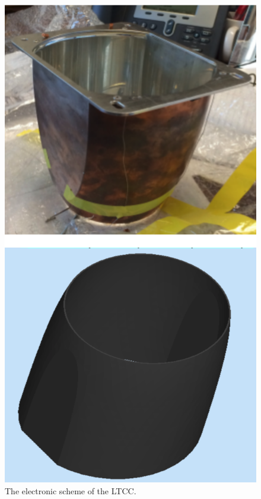 \begin{figure}
	\centering
	\includegraphics[width=0.95\columnwidth,keepaspectratio]{img/sim2.png}
	\caption{The electronic scheme of the LTCC.}
	\label{fig:sim2}
\end{figure}


